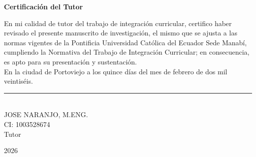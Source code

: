\clearpage
    \thispagestyle{plain}

    \begin{center}
        \vspace*{1.7cm}
        \textbf{Certificación del Tutor}

        \vspace{0.8cm}
        \raggedright
        En mi calidad de tutor del trabajo de integración curricular, certifico haber revisado el presente manuscrito de investigación, el mismo que se ajusta a las normas vigentes de la Pontificia Universidad Católica del Ecuador Sede Manabí, cumpliendo la Normativa del Trabajo de Integración Curricular; en consecuencia, es apto para su presentación y sustentación.\\
        En la ciudad de Portoviejo a los quince días del mes de febrero de dos mil veintiséis.
        \par
        \vspace{3.0cm}
        \centering

        \rule{7cm}{0.4pt} \\ %
        JOSE NARANJO, M.ENG.\\
        CI: 1003528674\\
        Tutor

        \vspace{3.0cm}

        

        2026
    \end{center}
\clearpage
